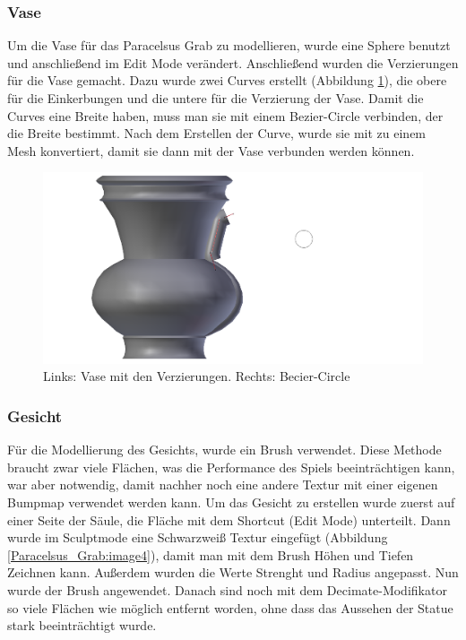 \subsubsection{Vase}
Um die Vase für das Paracelsus Grab zu modellieren, wurde eine Sphere benutzt und anschließend im Edit Mode verändert. Anschließend wurden die Verzierungen für die Vase gemacht.
Dazu wurde zwei Curves erstellt (Abbildung \ref{Paracelsus_Grab:image5}), die obere für die Einkerbungen und die untere für die Verzierung der Vase. Damit die Curves eine
Breite haben, muss man sie mit einem Bezier-Circle verbinden, der die Breite bestimmt. Nach dem Erstellen der Curve,
wurde sie mit  zu einem Mesh konvertiert, damit sie dann mit der Vase verbunden werden können.

\begin{figure}[H]
    \centering
    \includegraphics[width=.8\textwidth]{images/Paracelsus-Grab_Vase-Curve.png}
    \caption{Links: Vase mit den Verzierungen. Rechts: Becier-Circle}
    \label{Paracelsus_Grab:image5}
\end{figure}

\subsubsection{Gesicht}
Für die Modellierung des Gesichts, wurde ein Brush verwendet. Diese Methode braucht zwar viele Flächen, was die Performance des Spiels beeinträchtigen kann, war
aber notwendig, damit nachher noch eine andere Textur mit einer eigenen Bumpmap verwendet werden kann. Um das Gesicht zu erstellen wurde zuerst auf einer Seite der Säule,
die Fläche mit dem Shortcut   (Edit Mode) unterteilt. Dann wurde im Sculptmode eine Schwarzweiß Textur eingefügt (Abbildung \ref{Paracelsus_Grab:image4}),
damit man mit dem Brush Höhen und Tiefen Zeichnen kann. Außerdem wurden die Werte Strenght und Radius angepasst. Nun wurde der Brush angewendet. Danach sind noch mit dem
Decimate-Modifikator so viele Flächen wie möglich entfernt worden, ohne dass das Aussehen der Statue stark beeinträchtigt wurde.

